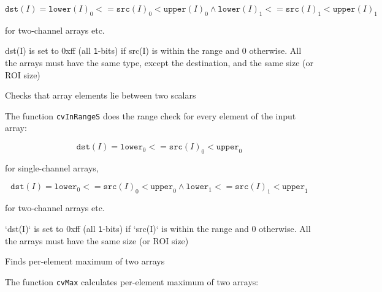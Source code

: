 \[
\texttt{dst}(I)=
\texttt{lower}(I)_0 <= \texttt{src}(I)_0 < \texttt{upper}(I)_0 \land
\texttt{lower}(I)_1 <= \texttt{src}(I)_1 < \texttt{upper}(I)_1
\]

for two-channel arrays etc.

dst(I) is set to 0xff (all \texttt{1}-bits) if src(I) is within the range and 0 otherwise. All the arrays must have the same type, except the destination, and the same size (or ROI size)



Checks that array elements lie between two scalars


\begin{description}
\end{description}


The function \texttt{cvInRangeS} does the range check for every element of the input array:

\[
\texttt{dst}(I)=\texttt{lower}_0 <= \texttt{src}(I)_0 < \texttt{upper}_0
\]

for single-channel arrays,

\[
\texttt{dst}(I)=
\texttt{lower}_0 <= \texttt{src}(I)_0 < \texttt{upper}_0 \land
\texttt{lower}_1 <= \texttt{src}(I)_1 < \texttt{upper}_1
\]

for two-channel arrays etc.

`dst(I)` is set to 0xff (all \texttt{1}-bits) if `src(I)` is within the range and 0 otherwise. All the arrays must have the same size (or ROI size)


Finds per-element maximum of two arrays


\begin{description}
\end{description}

The function \texttt{cvMax} calculates per-element maximum of two arrays:


